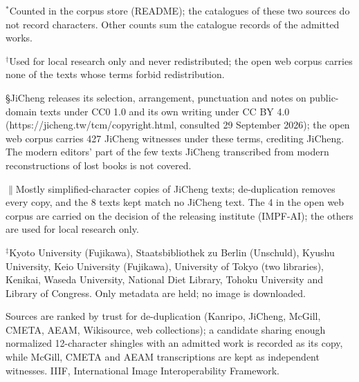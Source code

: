 \begin{table}[t]
\begin{tabular}{lllll}
\bottomrule
\end{tabular}
\par\footnotesize
$^{*}$Counted in the corpus store (README); the catalogues of these two sources do not record characters. Other counts sum the catalogue records of the admitted works.\par
$^{\dagger}$Used for local research only and never redistributed; the open web corpus carries none of the texts whose terms forbid redistribution.\par
\S{}JiCheng releases its selection, arrangement, punctuation and notes on public-domain texts under CC0 1.0 and its own writing under CC BY 4.0 (https://jicheng.tw/tcm/copyright.html, consulted 29 September 2026); the open web corpus carries 427 JiCheng witnesses under these terms, crediting JiCheng. The modern editors' part of the few texts JiCheng transcribed from modern reconstructions of lost books is not covered.\par
$\|$Mostly simplified-character copies of JiCheng texts; de-duplication removes every copy, and the 8 texts kept match no JiCheng text. The 4 in the open web corpus are carried on the decision of the releasing institute (IMPF-AI); the others are used for local research only.\par
$^{\ddagger}$Kyoto University (Fujikawa), Staatsbibliothek zu Berlin (Unschuld), Kyushu University, Keio University (Fujikawa), University of Tokyo (two libraries), Kenikai, Waseda University, National Diet Library, Tohoku University and Library of Congress. Only metadata are held; no image is downloaded.\par
Sources are ranked by trust for de-duplication (Kanripo, JiCheng, McGill, CMETA, AEAM, Wikisource, web collections); a candidate sharing enough normalized 12-character shingles with an admitted work is recorded as its copy, while McGill, CMETA and AEAM transcriptions are kept as independent witnesses. IIIF, International Image Interoperability Framework.\par
\end{table}
